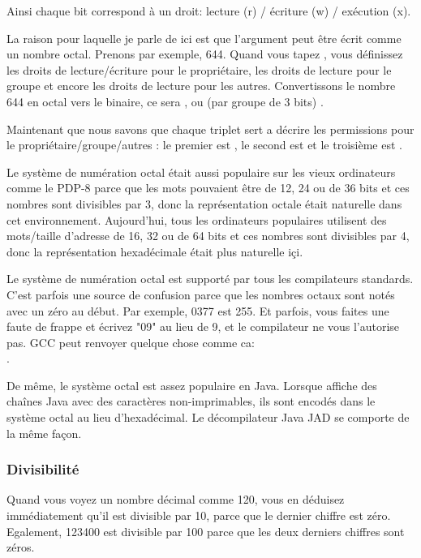 Ainsi chaque bit correspond à un droit: lecture (r) / écriture (w) / exécution (x).

La raison pour laquelle je parle de  ici est que l'argument peut être écrit comme un nombre octal.
Prenons par exemple, 644.
Quand vous tapez , vous définissez les droits de lecture/écriture pour le propriétaire, les droits de lecture pour le groupe et encore les droits de lecture pour les autres.
Convertissons le nombre 644 en octal vers le binaire, ce sera , ou (par groupe de 3 bits) .

Maintenant que nous savons que chaque triplet sert a décrire les permissions pour le propriétaire/groupe/autres : le premier est , le second est  et le troisième est .

Le système de numération octal était aussi populaire sur les vieux ordinateurs comme le PDP-8 parce que les mots pouvaient être de 12, 24 ou de 36 bits et ces nombres sont divisibles par 3, donc la représentation octale était naturelle dans cet environnement.
Aujourd'hui, tous les ordinateurs populaires utilisent des mots/taille d'adresse de 16, 32 ou de 64 bits et ces nombres sont divisibles par 4, donc la représentation hexadécimale était plus naturelle içi.

Le système de numération octal est supporté par tous les compilateurs \CCpp standards.
C'est parfois une source de confusion parce que les nombres octaux sont notés avec un zéro au début. Par exemple, 0377 est 255.
Et parfois, vous faites une faute de frappe et écrivez "09" au lieu de 9, et le compilateur ne vous l'autorise pas.
GCC peut renvoyer quelque chose comme ca:\\
.

De même, le système octal est assez populaire en Java. Lorsque \IDA affiche des chaînes
Java avec des caractères non-imprimables, ils sont encodés dans le système octal
au lieu d'hexadécimal.
Le décompilateur Java JAD se comporte de la même façon.

\subsubsection{Divisibilité}

Quand vous voyez un nombre décimal comme 120, vous en déduisez immédiatement qu'il est divisible par 10, parce que le dernier chiffre est zéro.
Egalement, 123400 est divisible par 100 parce que les deux derniers chiffres sont zéros.

